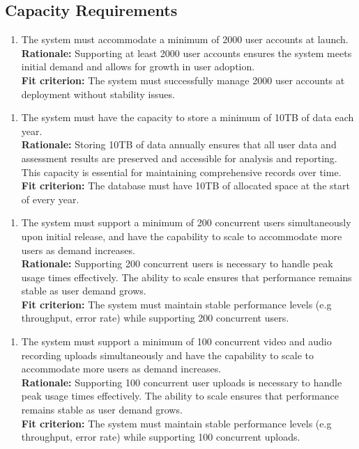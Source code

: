 \documentclass[12pt]{article}
\begin{document}
\subsection{Capacity Requirements}
\begin{enumerate}[{PR-CR}1. ]
  \item The system must accommodate a minimum of 2000 user accounts at launch.\\
  \textbf{Rationale: }Supporting at least 2000 user accounts ensures the system meets initial demand and allows for growth in user adoption.\\
  \textbf{Fit criterion: }The system must successfully manage 2000 user accounts at deployment without stability issues.  
\end{enumerate}
\begin{enumerate}[{PR-CR}2. ]
  \item The system must have the capacity to store a minimum of 10TB of data each year.\\
  \textbf{Rationale: }Storing 10TB of data annually ensures that all user data and assessment results are preserved and accessible for analysis and reporting. This capacity is essential for maintaining comprehensive records over time.\\
  \textbf{Fit criterion: }The database must have 10TB of allocated space at the start of every year.  
\end{enumerate}
\begin{enumerate}[{PR-CR}3. ]
  \item The system must support a minimum of 200 concurrent users simultaneously upon initial release, and have the capability to scale to accommodate more users as demand increases.\\
  \textbf{Rationale: }Supporting 200 concurrent users is necessary to handle peak usage times effectively. The ability to scale ensures that performance remains stable as user demand grows.\\
  \textbf{Fit criterion: }The system must maintain stable performance levels (e.g throughput, error rate) while supporting 200 concurrent users.  
\end{enumerate}
\begin{enumerate}[{PR-CR}4. ]
  \item The system must support a minimum of 100 concurrent video and audio recording uploads simultaneously and have the capability to scale to accommodate more users as demand increases.\\
  \textbf{Rationale: }Supporting 100 concurrent user uploads is necessary to handle peak usage times effectively. The ability to scale ensures that performance remains stable as user demand grows.\\
  \textbf{Fit criterion: }The system must maintain stable performance levels (e.g throughput, error rate) while supporting 100 concurrent uploads.  
\end{enumerate}
\end{document}
